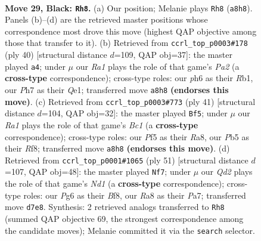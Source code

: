 \documentclass[11pt]{article}
\begin{document}
\clearpage

\begin{figure}[p]\centering
\begin{subfigure}{0.46\textwidth}\centering
\resizebox{\linewidth}{!}{%
\newchessgame
\chessboard[
  setfen={r7/pbrqbk1p/n5pP/1p1p1pP1/3P1P2/1P2P3/4N3/R2QKBNR b KQ - 5 29},
  showmover=false,
  pgfstyle=straightmove, color=movearrow, markmove={a8-h8}
]}
\caption{}
\end{subfigure}\hfill
\begin{subfigure}{0.46\textwidth}\centering
\resizebox{\linewidth}{!}{%
\newchessgame
\chessboard[
  setfen={2r1k2r/1pqn1p2/p2pp2b/4n2p/1NP1P1pP/1P4P1/P2B1PB1/1R2QRK1 w k - 3 21},
  showmover=false,
  pgfstyle=straightmove, color=movearrow, markmove={a2-a4}
]}
\caption{}
\end{subfigure}
\\[4pt]
\begin{subfigure}{0.46\textwidth}\centering
\resizebox{\linewidth}{!}{%
\newchessgame
\chessboard[
  setfen={r1b2rk1/2q2pb1/1p1p2pp/nB1P4/P1p1R2P/2P2N2/3N1PP1/2RQ2K1 b - - 1 21},
  showmover=false,
  pgfstyle=straightmove, color=movearrow, markmove={c8-f5}
]}
\caption{}
\end{subfigure}\hfill
\begin{subfigure}{0.46\textwidth}\centering
\resizebox{\linewidth}{!}{%
\newchessgame
\chessboard[
  setfen={3nrbk1/pp1q3p/2p1bpp1/8/2pP1BPP/2P1N3/PP2QPN1/R5K1 b - - 1 26},
  showmover=false,
  pgfstyle=straightmove, color=movearrow, markmove={d8-f7}
]}
\caption{}
\end{subfigure}
\caption{\textbf{Move 29, Black: \texttt{Rh8}.} (a) Our position; Melanie plays \texttt{Rh8} (\texttt{a8h8}). Panels (b)--(d) are the retrieved master positions whose correspondence most drove this move (highest QAP objective among those that transfer to it). (b) Retrieved from \texttt{ccrl\_top\_p0003\#178} (ply 40) [structural distance $d$=109, QAP obj=37]: the master played \texttt{a4}; under $\mu$ our \emph{Ra1} plays the role of that game's \emph{Pa2} (a \textbf{cross-type} correspondence); cross-type roles: our \emph{p}h6 as their \emph{R}b1, our \emph{P}h7 as their \emph{Q}e1; transferred move \texttt{a8h8} \textbf{(endorses this move)}. (c) Retrieved from \texttt{ccrl\_top\_p0003\#773} (ply 41) [structural distance $d$=104, QAP obj=32]: the master played \texttt{Bf5}; under $\mu$ our \emph{Ra1} plays the role of that game's \emph{Bc1} (a \textbf{cross-type} correspondence); cross-type roles: our \emph{P}f5 as their \emph{R}a8, our \emph{P}b5 as their \emph{R}f8; transferred move \texttt{a8h8} \textbf{(endorses this move)}. (d) Retrieved from \texttt{ccrl\_top\_p0001\#1065} (ply 51) [structural distance $d$=107, QAP obj=48]: the master played \texttt{Nf7}; under $\mu$ our \emph{Qd2} plays the role of that game's \emph{Nd1} (a \textbf{cross-type} correspondence); cross-type roles: our \emph{P}g6 as their \emph{B}f8, our \emph{R}a8 as their \emph{P}a7; transferred move \texttt{d7e8}. Synthesis: 2 retrieved analogs transferred to \texttt{Rh8} (summed QAP objective 69, the strongest correspondence among the candidate moves); Melanie committed it via the \texttt{search} selector.}
\label{fig:thought-m57}
\end{figure}
\end{document}
